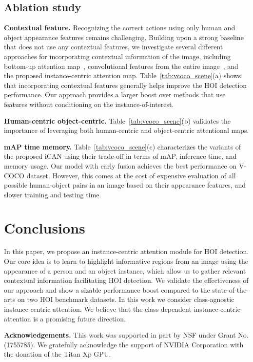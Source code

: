 \documentclass{bmvc2k}
\newlength\secmargin
\newcommand {\para}[1]{\vspace{1.5mm} \noindent \textbf{#1}}
\newcommand{\tabref}[1]{Table~\ref{tab:#1}}
\begin{document}
\vspace{\secmargin}
\subsection{Ablation study}
\vspace{\secmargin}



\para{Contextual feature.} Recognizing the correct actions using only human and object appearance features remains challenging.
Building upon a strong baseline that does not use any contextual features, we investigate several different approaches for incorporating contextual information of the image, including bottom-up attention map~\cite{Girdhar-NIPS-AttentionalPooling}, convolutional features from the entire image~\cite{Mallya-ECCV-Interactions}, and the proposed instance-centric attention map.
\tabref{vcoco_scene}(a) shows that incorporating contextual features generally helps improve the HOI detection performance.
Our approach provides a larger boost over methods that use features without conditioning on the instance-of-interest.



\para{Human-centric \vs object-centric.} \tabref{vcoco_scene}(b) validates the importance of leveraging both human-centric and object-centric attentional maps.


\para{mAP \vs time \vs memory.} \tabref{vcoco_scene}(c) characterizes the variants of the proposed iCAN using their trade-off in terms of mAP, inference time, and memory usage.
Our model with early fusion achieves the best performance on V-COCO dataset. 
However, this comes at the cost of expensive evaluation of all possible human-object pairs in an image based on their appearance features, and slower training and testing time.











 \vspace{-4mm}
\section{Conclusions}
\label{sec:conclusions}
\vspace{\secmargin}
In this paper, we propose an instance-centric attention module for HOI detection.
Our core idea is to learn to highlight informative regions from an image using the appearance of a person and an object instance, which allow us to gather relevant contextual information facilitating HOI detection.
We validate the effectiveness of our approach and show a sizable performance boost compared to the state-of-the-arts on two HOI benchmark datasets.
In this work we consider class-agnostic instance-centric attention. 
We believe that the class-dependent instance-centric attention is a promising future direction.

\textbf{Acknowledgements.} This work was supported in part by NSF under Grant No. (1755785). We gratefully acknowledge the support of NVIDIA Corporation with the donation of the Titan Xp GPU. 
\clearpage
{\small


}
\end{document}
